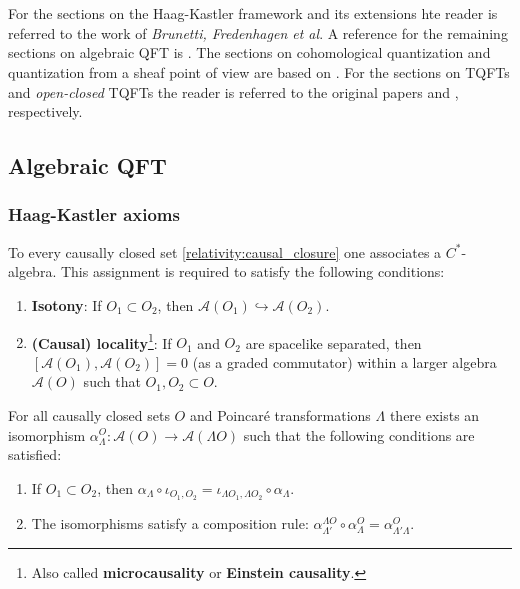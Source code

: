 \chapter{}

    For the sections on the Haag-Kastler framework and its extensions hte reader is referred to the work of \textit{Brunetti, Fredenhagen et al}. A reference for the remaining sections on algebraic QFT is \cite{baez_aqft}. The sections on cohomological quantization and quantization from a sheaf point of view are based on \cite{nuiten}. For the sections on TQFTs and \textit{open-closed} TQFTs the reader is referred to the original papers \cite{atiyah} and \cite{open_closed}, respectively.

\section{Algebraic QFT}
\subsection{Haag-Kastler axioms}\label{section:haag_kastler}

    \begin{axiom}\label{aqft:microcausality}
        To every causally closed set \ref{relativity:causal_closure} one associates a $C^*$-algebra. This assignment is required to satisfy the following conditions:
        \begin{enumerate}
            \item\textbf{Isotony}: If $O_1\subset O_2$, then $\mathcal{A}(O_1)\hookrightarrow\mathcal{A}(O_2)$.
            \item\textbf{(Causal) locality}\footnote{Also called \textbf{microcausality} or \textbf{Einstein causality}.}: If $O_1$ and $O_2$ are spacelike separated, then $[\mathcal{A}(O_1),\mathcal{A}(O_2)] = 0$ (as a graded commutator) within a larger algebra $\mathcal{A}(O)$ such that $O_1,O_2\subset O$.
        \end{enumerate}
    \end{axiom}

    \begin{axiom}
        For all causally closed sets $O$ and Poincar\'e transformations $\Lambda$ there exists an isomorphism $\alpha^O_\Lambda:\mathcal{A}(O)\rightarrow\mathcal{A}(\Lambda O)$ such that the following conditions are satisfied:
        \begin{enumerate}
            \item If $O_1\subset O_2$, then $\alpha_\Lambda\circ\iota_{O_1,O_2} = \iota_{\Lambda O_1,\Lambda O_2}\circ\alpha_\Lambda$.
            \item The isomorphisms satisfy a composition rule: $\alpha^{\Lambda O}_{\Lambda'}\circ\alpha^O_\Lambda = \alpha^O_{\Lambda'\Lambda}$.
        \end{enumerate}
    \end{axiom}

